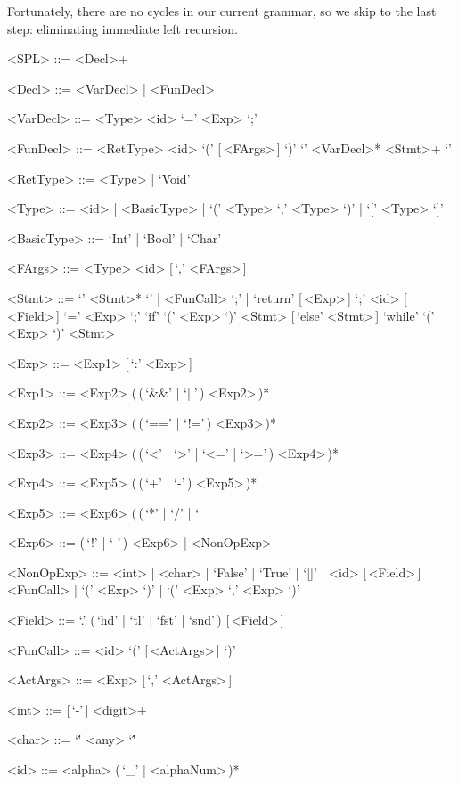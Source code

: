 \documentclass{article}
\begin{document}
Fortunately, there are no cycles in our current grammar, so we skip to the last step: eliminating immediate left recursion.
\begin{grammar}
    <SPL> ::= <Decl>+

    <Decl> ::= <VarDecl> | <FunDecl>

    <VarDecl> ::= <Type> <id> `=' <Exp> `;'

    <FunDecl> ::= <RetType> <id> `(' [\,<FArgs>\,] `)' `{' <VarDecl>* <Stmt>+ `}'

    <RetType> ::= <Type> | `Void'

    <Type> ::= <id> | <BasicType> | `(' <Type> `,' <Type> `)' | `[' <Type> `]'

    <BasicType> ::= `Int' | `Bool' | `Char'

    <FArgs> ::= <Type> <id> [\,`,' <FArgs>\,]

    <Stmt> ::= `{' <Stmt>* `}' | <FunCall> `;' | `return' [\,<Exp>\,] `;'
    \alt <id> [\,<Field>\,] `=' <Exp> `;'
    \alt `if' `(' <Exp> `)' <Stmt> [\,`else' <Stmt>\,]
    \alt `while' `(' <Exp> `)' <Stmt>

    <Exp> ::= <Exp1> [\,`:' <Exp>\,]

    <Exp1> ::= <Exp2> (\,(\,`&&' | `||'\,) <Exp2>\,)*

    <Exp2> ::= <Exp3> (\,(\,`==' | `!='\,) <Exp3>\,)*

    <Exp3> ::= <Exp4> (\,(\,`<' | `>' | `<=' | `>='\,) <Exp4>\,)*

    <Exp4> ::= <Exp5> (\,(\,`+' | `-'\,) <Exp5>\,)*

    <Exp5> ::= <Exp6> (\,(\,`*' | `/' | `%

    <Exp6> ::= (\,`!' | `-'\,) <Exp6> | <NonOpExp>

    <NonOpExp> ::= <int> | <char> | `False' | `True' | `[]' | <id> [\,<Field>\,]
    \alt <FunCall> | `(' <Exp> `)' | `(' <Exp> `,' <Exp> `)'

    <Field> ::= `.' (\,`hd' | `tl' | `fst' | `snd'\,) [\,<Field>\,]

    <FunCall> ::= <id> `(' [\,<ActArgs>\,] `)'

    <ActArgs> ::= <Exp> [\,`,' <ActArgs>\,]

    <int> ::= [\,`-'\,] <digit>+

    <char> ::= `\'' <any> `\''

    <id> ::= <alpha> (\,`_' | <alphaNum>\,)*
\end{grammar}
\end{document}
